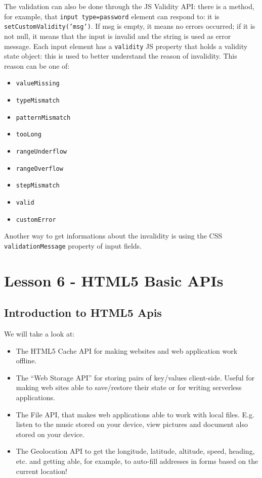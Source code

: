 \documentclass[a4paper,11pt]{book}
\begin{document}
The validation can also be done through the JS Validity API: there is a method, for
example, that \texttt{input type=password} element can respond to: it is
\texttt{setCustomValidity('msg')}.
If msg is empty, it means no errors occurred; if it is not null, it means that
the input is invalid and the string is used as error message.
Each input element has a \texttt{validity} JS property that holds a validity
state object: this is used to better understand the reason of invalidity.
This reason can be one of:
\begin{itemize}
\item \texttt{valueMissing}
\item \texttt{typeMismatch}
\item \texttt{patternMismatch}
\item \texttt{tooLong}
\item \texttt{rangeUnderflow}
\item \texttt{rangeOverflow}
\item \texttt{stepMismatch}
\item \texttt{valid}
\item \texttt{customError}
\end{itemize}
Another way to get informations about the invalidity is using the
CSS \texttt{validationMessage} property of input fields.


\chapter{Lesson 6 - HTML5 Basic APIs}
\section{Introduction to HTML5 Apis}
We will take a look at:
\begin{itemize}
\item The HTML5 Cache API for making websites and web application work offline.
\item The ``Web Storage API'' for storing pairs of key/values client-side. Useful
	for making web sites able to save/restore their state or for writing serverless
	applications.
\item The File API, that makes web applications able to work with local files. E.g.
	listen to the music stored on your device, view pictures and document also stored
	on your device.
\item The Geolocation API to get the longitude, latitude, altitude, speed, heading, etc.
	and getting able, for example, to auto-fill addresses in forms based on the current
	location!
\end{itemize}
\end{document}
